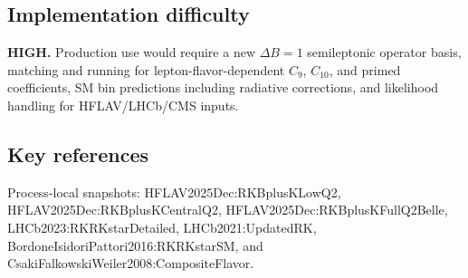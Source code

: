 \subsection*{Implementation difficulty}
\textbf{HIGH.}  Production use would require a new \(\Delta B=1\) semileptonic
operator basis, matching and running for lepton-flavor-dependent \(C_9\),
\(C_{10}\), and primed coefficients, SM bin predictions including radiative
corrections, and likelihood handling for HFLAV/LHCb/CMS inputs.

\subsection*{Key references}
Process-local snapshots: HFLAV2025Dec:RKBplusKLowQ2,
HFLAV2025Dec:RKBplusKCentralQ2, HFLAV2025Dec:RKBplusKFullQ2Belle,
LHCb2023:RKRKstarDetailed, LHCb2021:UpdatedRK,
BordoneIsidoriPattori2016:RKRKstarSM, and
CsakiFalkowskiWeiler2008:CompositeFlavor.
